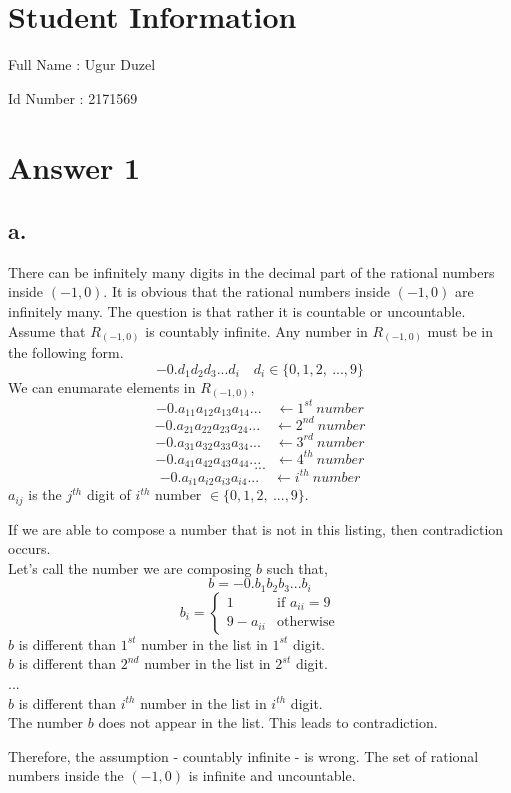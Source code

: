 \documentclass[12pt]{article}
\begin{document}
\section*{Student Information } 
Full Name :  Ugur Duzel \par
Id Number :  2171569 \\

\section*{Answer 1}

\subsection*{a.}
There can be infinitely many digits in the decimal part of the rational numbers inside $(-1,0)$. It is obvious that the rational numbers inside $(-1,0)$ are infinitely many. The question is that rather it is countable or uncountable.
Assume that $R_{(-1,0)}$ is countably infinite. Any number in $R_{(-1,0)}$ must be in the following form. 
$$-0.d_1d_2d_3...d_i\quad d_i\in \{0,1,2,\ ...,9\}$$
We can enumarate elements in $R_{(-1,0)}$,
$$-0.a_{11}a_{12}a_{13}a_{14}... \quad \leftarrow 1^{st}\ number$$
$$-0.a_{21}a_{22}a_{23}a_{24}... \quad \leftarrow 2^{nd}\ number$$
$$-0.a_{31}a_{32}a_{33}a_{34}... \quad \leftarrow 3^{rd}\ number$$
$$-0.a_{41}a_{42}a_{43}a_{44}... \quad \leftarrow 4^{th}\ number$$
$$...$$
$$-0.a_{i1}a_{i2}a_{i3}a_{i4}... \quad \leftarrow i^{th}\ number$$
$a_{ij}$ is the $j^{th}$ digit of $i^{th}$ number $\in \{0,1,2,\ ...,9\}$. \\ \par
If we are able to compose a number that is not in this listing, then contradiction occurs. \\ 
Let's call the number we are composing $b$ such that, 
$$b=-0.b_1b_2b_3...b_i$$
\[
  b_i =
  \begin{cases}
                                   1 & \text{if $a_{ii}=9$} \\
                                   9-a_{ii} & \text{otherwise} 
  \end{cases}
\]
$b$ is different than $1^{st}$ number in the list in $1^{st}$ digit. \\
$b$ is different than $2^{nd}$ number in the list in $2^{st}$ digit. \\
...\\
$b$ is different than $i^{th}$ number in the list in $i^{th}$ digit. \\
The number $b$ does not appear in the list. This leads to contradiction. \\ \par
Therefore, the assumption - countably infinite - is wrong.  The set of rational numbers inside the $(-1,0)$ is infinite and uncountable.
\end{document}
